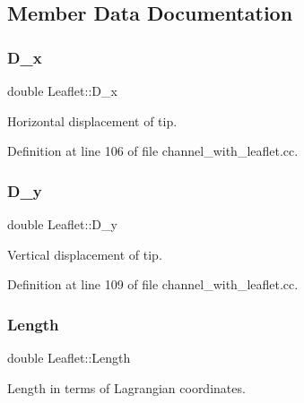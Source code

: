 \subsection{Member Data Documentation}
\mbox{\label{classLeaflet_a473b6f4ef98bfba9e2c6974027ba4f4b}} 
\subsubsection{\texorpdfstring{D\+\_\+x}{D\_x}}
{\footnotesize\ttfamily double Leaflet\+::\+D\+\_\+x\hspace{0.3cm}{\ttfamily [private]}}



Horizontal displacement of tip. 



Definition at line 106 of file channel\+\_\+with\+\_\+leaflet.\+cc.

\mbox{\label{classLeaflet_af9c75c7aeecae4b14f7ba0fb245eb8ee}} 
\subsubsection{\texorpdfstring{D\+\_\+y}{D\_y}}
{\footnotesize\ttfamily double Leaflet\+::\+D\+\_\+y\hspace{0.3cm}{\ttfamily [private]}}



Vertical displacement of tip. 



Definition at line 109 of file channel\+\_\+with\+\_\+leaflet.\+cc.

\mbox{\label{classLeaflet_a64c27b796ceece358d09d137f15bbf20}} 
\subsubsection{\texorpdfstring{Length}{Length}}
{\footnotesize\ttfamily double Leaflet\+::\+Length\hspace{0.3cm}{\ttfamily [private]}}



Length in terms of Lagrangian coordinates. 



